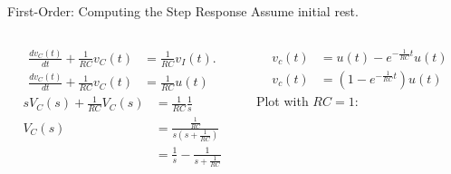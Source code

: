 \begin{frame}{First-Order: Computing the Step Response}
    Assume initial rest.
    \begin{columns}[T,totalwidth=\textwidth]
        \begin{column}{0.5\textwidth}
            \begin{align*}
                \frac{dv_C(t)}{dt} + \frac{1}{RC}v_C(t) &= \frac{1}{RC}v_I(t).\\
                \frac{dv_C(t)}{dt} + \frac{1}{RC}v_C(t) &= \frac{1}{RC}u(t)
            \end{align*}
            \begin{align*}
                sV_C(s) + \frac{1}{RC}V_C(s) &= \frac{1}{RC}\frac{1}{s}\\
                V_C(s) &= \frac{\frac{1}{RC}}{s(s+ \frac{1}{RC})}\\
                &= \frac{1}{s}  - \frac{1}{s+ \frac{1}{RC}}
            \end{align*}
        \end{column}
        \begin{column}{0.5\textwidth}
            \begin{align*}
                v_c(t) &= u(t) - e^{-\frac{1}{RC}t}u(t)\\
                v_c(t) &= \left(1 - e^{-\frac{1}{RC}t}\right)u(t)
            \end{align*}
            Plot with $RC=1$:
            \begin{center}
                 
            \end{center}            
        \end{column}
    \end{columns}
\end{frame}